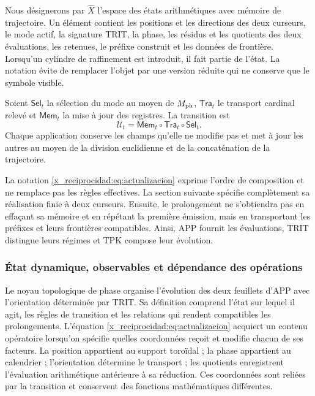 Nous désignerons par \(\widehat X\) l'espace des états arithmétiques avec mémoire de trajectoire. Un élément contient les positions et les directions des deux curseurs, le mode actif, la signature TRIT, la phase, les résidus et les quotients des deux évaluations, les retenues, le préfixe construit et les données de frontière. Lorsqu'un cylindre de raffinement est introduit, il fait partie de l'état. La notation évite de remplacer l'objet par une version réduite qui ne conserve que le symbole visible.

\begin{definition}
Soient \(\mathsf{Sel}_t\) la sélection du mode au moyen de \(M_{\rm ph}\), \(\mathsf{Tra}_t\) le transport cardinal relevé et \(\mathsf{Mem}_t\) la mise à jour des registres. La transition est
\begin{equation}
 \mathcal U_t=\mathsf{Mem}_t\circ\mathsf{Tra}_t\circ\mathsf{Sel}_t.
 \label{x_reciprocidad:eq:actualizacion}
\end{equation}
Chaque application conserve les champs qu'elle ne modifie pas et met à jour les autres au moyen de la division euclidienne et de la concaténation de la trajectoire.
\end{definition}

La notation \eqref{x_reciprocidad:eq:actualizacion} exprime l'ordre de composition et ne remplace pas les règles effectives. La section suivante spécifie complètement sa réalisation finie à deux curseurs. Ensuite, le prolongement ne s'obtiendra pas en effaçant sa mémoire et en répétant la première émission, mais en transportant les préfixes et leurs frontières compatibles. Ainsi, APP fournit les évaluations, TRIT distingue leurs régimes et TPK compose leur évolution.



\subsubsection{État dynamique, observables et dépendance des opérations}
\label{x_reciprocidad:tpk-int:estado}

Le noyau topologique de phase organise l'évolution des deux feuillets d'APP avec l'orientation déterminée par TRIT. Sa définition comprend l'état sur lequel il agit, les règles de transition et les relations qui rendent compatibles les prolongements. L'équation \eqref{x_reciprocidad:eq:actualizacion} acquiert un contenu opératoire lorsqu'on spécifie quelles coordonnées reçoit et modifie chacun de ses facteurs. La position appartient au support toroïdal ; la phase appartient au calendrier ; l'orientation détermine le transport ; les quotients enregistrent l'évaluation arithmétique antérieure à sa réduction. Ces coordonnées sont reliées par la transition et conservent des fonctions mathématiques différentes.

